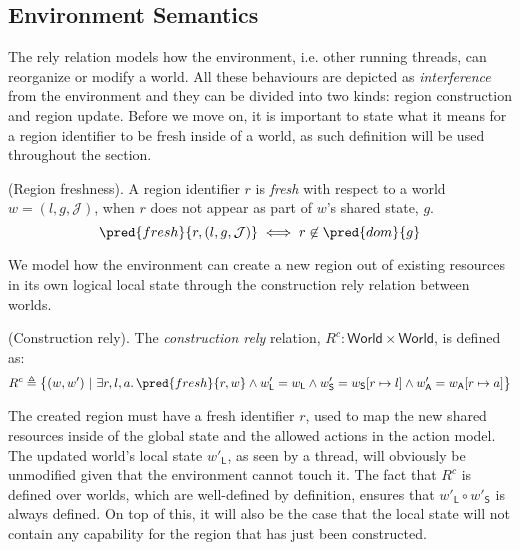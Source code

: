 \subsection{Environment Semantics}

The rely relation models how the environment, i.e. other running threads, can reorganize or modify a world. All these behaviours are depicted as \textit{interference} from the environment and they can be divided into two kinds: region construction and region update. Before we move on, it is important to state what it means for a region identifier to be fresh inside of a world, as such definition will be used throughout the section.

\begin{defn}
	(Region freshness).
	A region identifier $r$ is \emph{fresh} with respect to a world $w = (l, g, \mathcal{J})$, when $r$ does not appear as part of $w$'s shared state, $g$.
	\[
		\pred{fresh}{r, (l, g, \mathcal{J})}
			\iff
		r \not\in \pred{dom}{g}
	\]
\end{defn}

We model how the environment can create a new region out of existing resources in its own logical local state through the construction rely relation between worlds.
\begin{defn}
	(Construction rely).
	The \emph{construction rely} relation, $R^c : \mathsf{World} \times \mathsf{World}$, is defined as:
	\[
		R^c \triangleq \big\{ (w, w')\ |\ 
			\exists r, l, a \ldotp \pred{fresh}{r, w} \land w'_\mathsf{L} = w_\mathsf{L} \land w'_\mathsf{S} = w_\mathsf{S}[r \mapsto l] \land w'_\mathsf{A} = w_\mathsf{A}[r \mapsto a]
		\big\}
	\]
\end{defn}
The created region must have a fresh identifier $r$, used to map the new shared resources inside of the global state and the allowed actions in the action model. The updated world's local state $w'_\mathsf{L}$, as seen by a thread, will obviously be unmodified given that the environment cannot touch it. The fact that $R^c$ is defined over worlds, which are well-defined by definition, ensures that $w'_\mathsf{L} \circ w'_\mathsf{S}$ is always defined. On top of this, it will also be the case that the local state will not contain any capability for the region that has just been constructed.


